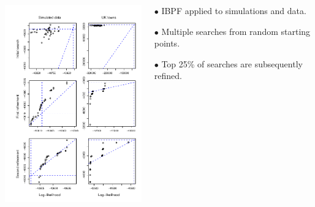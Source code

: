 \documentclass{beamer}
\begin{document}
\begin{frame}

  
\vspace{-6mm}

\begin{columns}[T] %
\begin{column}{.75\textwidth}
  \includegraphics[width=6.8cm]{ibpf/search_diagnostics-1.pdf}
\end{column}

\hspace{-15mm}
\begin{column}{.35\textwidth}
  \vspace{10mm}
  
$\bullet$    IBPF applied to simulations and data.

    \vspace{5mm}

$\bullet$    Multiple searches from random starting points.

    \vspace{5mm}
    
$\bullet$    Top 25\% of searches are subsequently refined.
    
  \end{column}
\end{columns}

\end{frame}
\end{document}
